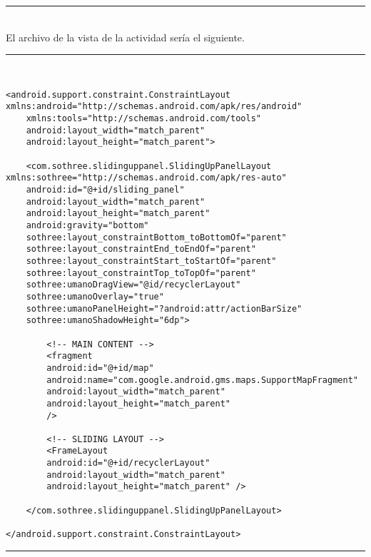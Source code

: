\noindent\rule[-1ex]{\textwidth}{1pt}\\
\newpage
El archivo de la vista de la actividad sería el siguiente.\newline
\noindent\rule[-1ex]{\textwidth}{1pt}\\
\begin{lstlisting}[caption=Código XML de la vista de la actividad principal.]
<android.support.constraint.ConstraintLayout xmlns:android="http://schemas.android.com/apk/res/android"
	xmlns:tools="http://schemas.android.com/tools"
	android:layout_width="match_parent"
	android:layout_height="match_parent">

	<com.sothree.slidinguppanel.SlidingUpPanelLayout xmlns:sothree="http://schemas.android.com/apk/res-auto"
	android:id="@+id/sliding_panel"
	android:layout_width="match_parent"
	android:layout_height="match_parent"
	android:gravity="bottom"
	sothree:layout_constraintBottom_toBottomOf="parent"
	sothree:layout_constraintEnd_toEndOf="parent"
	sothree:layout_constraintStart_toStartOf="parent"
	sothree:layout_constraintTop_toTopOf="parent"
	sothree:umanoDragView="@id/recyclerLayout"
	sothree:umanoOverlay="true"
	sothree:umanoPanelHeight="?android:attr/actionBarSize"
	sothree:umanoShadowHeight="6dp">

		<!-- MAIN CONTENT -->
		<fragment
		android:id="@+id/map"
		android:name="com.google.android.gms.maps.SupportMapFragment"
		android:layout_width="match_parent"
		android:layout_height="match_parent"
		/>
		
		<!-- SLIDING LAYOUT -->
		<FrameLayout
		android:id="@+id/recyclerLayout"
		android:layout_width="match_parent"
		android:layout_height="match_parent" />
	
	</com.sothree.slidinguppanel.SlidingUpPanelLayout>

</android.support.constraint.ConstraintLayout>
\end{lstlisting}
\noindent\rule[-1ex]{\textwidth}{1pt}\\
